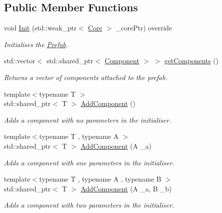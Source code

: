 \subsection*{Public Member Functions}
\begin{DoxyCompactItemize}
\item 
void \hyperlink{classfrontier_1_1_prefab_a69924d353fb96975efbba17dc0ba3f3a}{Init} (std\+::weak\+\_\+ptr$<$ \hyperlink{classfrontier_1_1_core}{Core} $>$ \+\_\+core\+Ptr) override
\begin{DoxyCompactList}\small\item\em Initialises the \hyperlink{classfrontier_1_1_prefab}{Prefab}. \end{DoxyCompactList}\item 
std\+::vector$<$ std\+::shared\+\_\+ptr$<$ \hyperlink{classfrontier_1_1_component}{Component} $>$ $>$ \hyperlink{classfrontier_1_1_prefab_a0d857efae6fb692384a6ab0144d66898}{get\+Components} ()
\begin{DoxyCompactList}\small\item\em Returns a vector of components attached to the prefab. \end{DoxyCompactList}\item 
{\footnotesize template$<$typename T $>$ }\\std\+::shared\+\_\+ptr$<$ T $>$ \hyperlink{classfrontier_1_1_prefab_a3099b0a889fb31500c7620bf96d878a1}{Add\+Component} ()
\begin{DoxyCompactList}\small\item\em Adds a component with no parameters in the initialiser. \end{DoxyCompactList}\item 
{\footnotesize template$<$typename T , typename A $>$ }\\std\+::shared\+\_\+ptr$<$ T $>$ \hyperlink{classfrontier_1_1_prefab_a96024d1688036fa4e6f7ec1a9d27b906}{Add\+Component} (A \+\_\+a)
\begin{DoxyCompactList}\small\item\em Adds a component with one parameters in the initialiser. \end{DoxyCompactList}\item 
{\footnotesize template$<$typename T , typename A , typename B $>$ }\\std\+::shared\+\_\+ptr$<$ T $>$ \hyperlink{classfrontier_1_1_prefab_acfe04a37ed21051b13f6c238505d654a}{Add\+Component} (A \+\_\+a, B \+\_\+b)
\begin{DoxyCompactList}\small\item\em Adds a component with two parameters in the initialiser. \end{DoxyCompactList}\item 

\end{DoxyCompactItemize}
